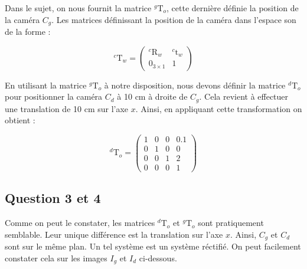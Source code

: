\documentclass[12pt]{report}
\begin{document}
Dans le sujet, on nous fournit la matrice $^{g}\textrm{T}_o$, cette dernière définie la position de la caméra $C_g$. Les matrices définissant la position de la caméra dans l'espace son de la forme :

\[ ^{c}\textrm{T}_w = \begin{pmatrix}
^{c}\textrm{R}_w & ^{c}\textrm{t}_w  \\
 0_{3 \times 1} & 1
\end{pmatrix} \]

En utilisant la matrice $^{g}\textrm{T}_o$ à notre disposition, nous devons définir la matrice $^{d}\textrm{T}_o$ pour positionner la caméra $C_d$ à 10 cm à droite de $C_g$. Cela revient à effectuer une translation de 10 cm sur l'axe $x$. Ainsi, en appliquant cette transformation on obtient :

\[ ^{d}\textrm{T}_o = \begin{pmatrix}
1 & 0 & 0 & 0.1\\ 
0 & 1 & 0 & 0\\ 
0 & 0 & 1 & 2\\
0 & 0 & 0 & 1
\end{pmatrix} \]

\subsection*{Question 3 et 4}

Comme on peut le constater, les matrices $^{d}\textrm{T}_o$ et $^{g}\textrm{T}_o$ sont pratiquement semblable. Leur unique différence est la translation sur l'axe $x$. Ainsi, $C_g$ et $C_d$ sont sur le même plan. Un tel système est un système réctifié. On peut facilement constater cela sur les images $I_g$ et $I_d$ ci-dessous.
\end{document}
